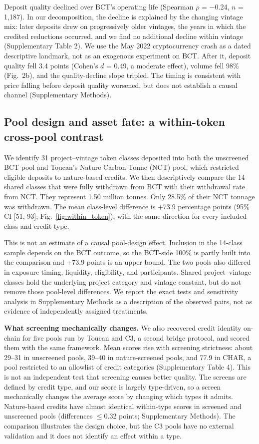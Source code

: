 \documentclass[sn-nature,Numbered]{sn-jnl}
\begin{document}
Deposit quality declined over BCT's operating life (Spearman $\rho$ = $-$0.24, $n$ = 1,187). In our decomposition, the decline is explained by the changing vintage mix: later deposits drew on progressively older vintages, the years in which the credited reductions occurred, and we find no additional decline within vintage (Supplementary Table 2). We use the May 2022 cryptocurrency crash as a dated descriptive landmark, not as an exogenous experiment on BCT. After it, deposit quality fell 3.4 points (Cohen's $d$ = 0.49, a moderate effect), volume fell 98\% (Fig.~2b), and the quality-decline slope tripled. The timing is consistent with price falling before deposit quality worsened, but does not establish a causal channel (Supplementary Methods).

\subsection*{Pool design and asset fate: a within-token cross-pool contrast}

We identify 31 project--vintage token classes deposited into both the unscreened BCT pool and Toucan's Nature Carbon Tonne (NCT) pool, which restricted eligible deposits to nature-based credits. We then descriptively compare the 14 shared classes that were fully withdrawn from BCT with their withdrawal rate from NCT. They represent 1.50 million tonnes. Only 28.5\% of their NCT tonnage was withdrawn. The mean class-level difference is +73.9 percentage points (95\% CI [51, 93]; Fig.~\ref{fig:within_token}), with the same direction for every included class and credit type.

This is not an estimate of a causal pool-design effect. Inclusion in the 14-class sample depends on the BCT outcome, so the BCT-side 100\% is partly built into the comparison and +73.9 points is an upper bound. The two pools also differed in exposure timing, liquidity, eligibility, and participants. Shared project--vintage classes hold the underlying project category and vintage constant, but do not remove those pool-level differences. We report the exact tests and sensitivity analysis in Supplementary Methods as a description of the observed pairs, not as evidence of independently assigned treatments.

\textbf{What screening mechanically changes.} We also recovered credit identity on-chain for five pools run by Toucan and C3, a second bridge protocol, and scored them with the same framework. Mean scores rise with screening strictness: about 29--31 in unscreened pools, 39--40 in nature-screened pools, and 77.9 in CHAR, a pool restricted to an allowlist of credit categories (Supplementary Table 4). This is not an independent test that screening causes better quality. The screens are defined by credit type, and our score is largely type-driven, so a screen mechanically changes the average score by changing which types it admits. Nature-based credits have almost identical within-type scores in screened and unscreened pools (differences $\leq$0.32 points; Supplementary Methods). The comparison illustrates the design choice, but the C3 pools have no external validation and it does not identify an effect within a type.
\end{document}
